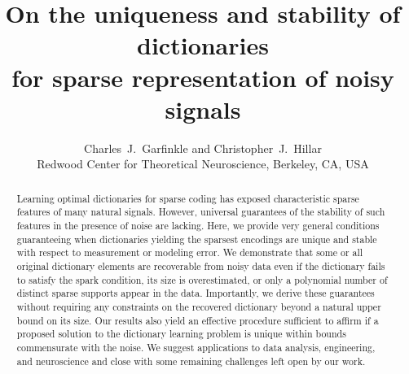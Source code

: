 \documentclass[journal, twocolumn]{IEEEtran}
\begin{document}
\title{On the uniqueness and stability of dictionaries \\ for sparse representation of noisy signals}

\author{Charles~J.~Garfinkle and Christopher~J.~Hillar \\
Redwood Center for Theoretical Neuroscience, Berkeley, CA, USA
}

\maketitle


\begin{abstract}
Learning optimal dictionaries for sparse coding has exposed characteristic sparse features of many natural signals. However, universal guarantees of the stability of such features in the presence of noise are lacking. Here, we provide very general conditions guaranteeing when dictionaries yielding the sparsest encodings are unique and stable with respect to measurement or modeling error. We demonstrate that some or all original dictionary elements are recoverable from noisy data even if the dictionary fails to satisfy the spark condition, its size is overestimated, or only a polynomial number of distinct sparse supports appear in the data. Importantly, we derive these guarantees without requiring any constraints on the recovered dictionary beyond a natural upper bound on its size. Our results also yield an effective procedure sufficient to affirm if a proposed solution to the dictionary learning problem is unique within bounds commensurate with the noise. We suggest applications to data analysis, engineering, and neuroscience and close with some remaining challenges left open by our work.
\end{abstract}
\end{document}
